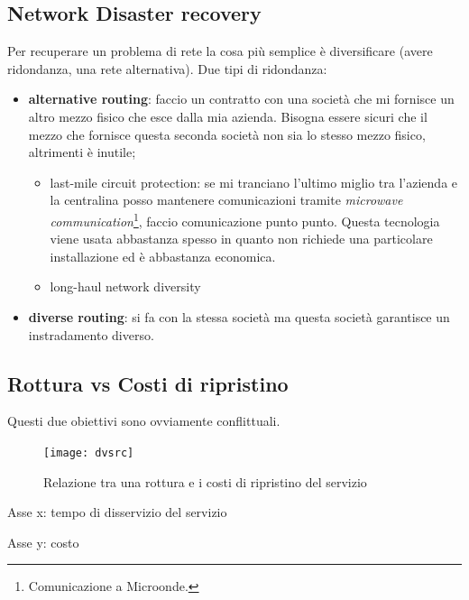 \subsection{Network Disaster recovery}

Per recuperare un problema di rete la cosa più semplice è diversificare (avere 
ridondanza, una rete alternativa). Due tipi di ridondanza:
\begin{itemize}
  \item \textbf{alternative routing}: faccio un contratto con una società che 
  mi fornisce un altro mezzo fisico che esce dalla mia azienda. Bisogna essere 
sicuri che il mezzo che fornisce questa seconda società non sia lo stesso mezzo 
fisico, altrimenti è inutile;
  \begin{itemize}
    \item last-mile circuit protection: se mi tranciano l'ultimo miglio tra 
l'azienda e la centralina posso mantenere comunicazioni tramite 
\textit{microwave communication}\footnote{Comunicazione a Microonde.}, faccio 
comunicazione punto punto. Questa tecnologia viene usata abbastanza spesso in 
quanto non richiede una particolare installazione ed è abbastanza economica.
    \item long-haul network diversity
  \end{itemize}
  \item \textbf{diverse routing}: si fa con la stessa società ma questa società 
garantisce un instradamento diverso.
\end{itemize}

\subsection{Rottura vs Costi di ripristino}

Questi due obiettivi sono ovviamente conflittuali.

\begin{figure}[H]
 \centering
 \texttt{[image: dvsrc]}
 \caption{Relazione tra una rottura e i costi di ripristino del servizio}
\end{figure}

Asse x: tempo di disservizio del servizio

Asse y: costo

